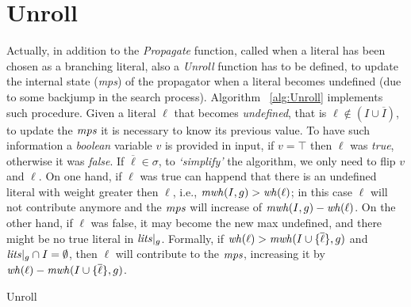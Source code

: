 \section{Unroll}
Actually, in addition to the \textit{Propagate} function, called when a literal has been chosen as a branching literal,
also a \textit{Unroll} function has to be defined, to update the internal state (\textit{mps}) of the propagator when a literal 
becomes undefined (due to some backjump in the search process).
Algorithm ~\ref{alg:Unroll} implements such procedure.
Given a literal $\ell$ that becomes \textit{undefined}, that is $\ell \not\in (I \cup \overline{I})$,
to update the $\mathit{mps}$ it is necessary to know its previous value.
To have such information a \textit{boolean} variable $v$ is provided in input, if $v = \top$
then $\ell$ was \textit{true}, otherwise it was \textit{false}.
If $\overline{\ell} \in \sigma$, to \textit{`simplify'} the algorithm, we only need to flip $v$ and $\ell$.
On one hand, if $\ell$ was true can happend that there is an undefined literal
with weight greater then $\ell$, i.e., $\mathit{mwh}(I,g) > \mathit{wh}(\ell)$;
in this case $\ell$ will not contribute anymore and 
the $\mathit{mps}$ will increase of $\mathit{mwh}(I,g) - \mathit{wh}(\ell)$.
On the other hand, if $\ell$ was false, it may become the new max undefined,
and there might be no true literal in $\mathit{lits}|_g$. 
Formally, if $\mathit{wh}(\ell) > \mathit{mwh}(I \cup \{\overline{\ell}\}, g)$ and $\mathit{lits}|_g \cap I = \emptyset$, 
then $\ell$ will contribute to the $\mathit{mps}$,
increasing it by $\mathit{wh}(\ell) - \mathit{mwh}(I \cup \{\overline{\ell}\}, g)$.

\begin{algorithm}[H]\small
    \caption{Unroll}
    \label{alg:Unroll}
\end{algorithm}
